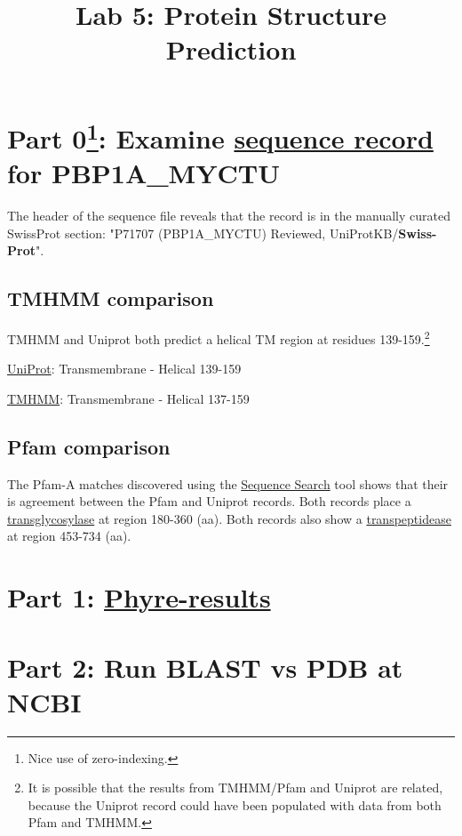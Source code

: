\documentclass[11pt]{article}
\title{Lab 5: Protein Structure Prediction}
\author{\Name}%
\begin{document}
\maketitle

\section*{Part 0\footnote{Nice use of zero-indexing.}:   Examine \href{http://www.uniprot.org/uniprot/P71707}{sequence record} for PBP1A\_MYCTU}

The header of the sequence file reveals that the record is in the manually curated SwissProt
section:  "P71707 (PBP1A\_MYCTU) Reviewed, UniProtKB/{\bf Swiss-Prot}".

\subsection{TMHMM comparison}

TMHMM and Uniprot both predict a helical TM region at residues 139-159.\footnote{It is possible that the results from TMHMM/Pfam and Uniprot are related, because
the Uniprot record could have been populated with data from both Pfam and TMHMM.}

\href{http://www.uniprot.org/uniprot/P71707}{UniProt}: Transmembrane - Helical 139-159

\href{http://www.cbs.dtu.dk/cgi-bin/webface2.fcgi?jobid=5318B8E100002CA9C6B99942&wait=20}{TMHMM}:   Transmembrane - Helical 137-159

\subsection{Pfam comparison}

The Pfam-A matches discovered using the \href{http://pfam.sanger.ac.uk/search/sequence}{Sequence Search} tool
shows that their is agreement between the Pfam and Uniprot records. Both records 
place a \href{http://pfam.sanger.ac.uk/family/PF00912.17}{transglycosylase} at 
region 180-360 (aa). Both records also show a \href{http://pfam.sanger.ac.uk/family/PF00905.17}{transpeptidease}
at region 453-734 (aa).


\section*{Part 1: \href{http://www.sbg.bio.ic.ac.uk/phyre2/phyre2_output/083b01625d2f5d9b/summary.html}{Phyre-results}}

\section*{Part 2: Run BLAST vs PDB at NCBI}
\end{document}
